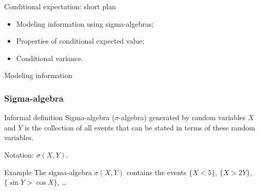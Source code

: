 
\begin{frame} %

    
\end{frame}
    
    
\begin{frame}{Conditional expectation: short plan}
    
      \begin{itemize}[<+->]
        \item Modeling information using \alert{sigma-algebras};
        \item \alert{Properties} of conditional expected value;
        \item Conditional \alert{variance}.
      \end{itemize}
    
\end{frame}
    
    
\begin{frame}{Modeling information}
    



    
\end{frame}



\begin{frame}
    \frametitle{Sigma-algebra}

    \pause
    \begin{block}{Informal definition \informalduck}
        \alert{Sigma-algebra} ($\sigma$-algebra) generated by random variables $X$ and $Y$ is the collection 
        of all events that can be stated in terms of these random variables. 
        
        \pause
        Notation: $\sigma(X, Y)$.
    \end{block}

    \pause
    \begin{block}{Example}
    The sigma-algebra $\sigma(X, Y)$ contains the events $\{X < 5\}$, $\{X > 2Y\}$, $\{\sin Y > \cos X\}$, \ldots
    \end{block}    

\end{frame}


